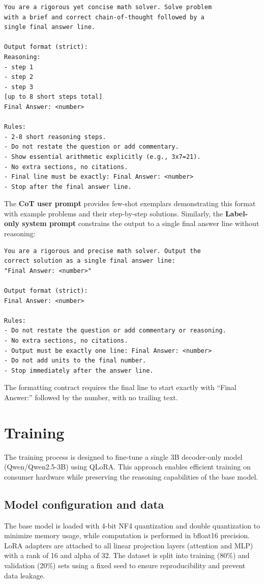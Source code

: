 \begin{verbatim}
You are a rigorous yet concise math solver. Solve problem 
with a brief and correct chain-of-thought followed by a 
single final answer line.

Output format (strict):
Reasoning:
- step 1
- step 2
- step 3
[up to 8 short steps total]
Final Answer: <number>

Rules:
- 2-8 short reasoning steps.
- Do not restate the question or add commentary.
- Show essential arithmetic explicitly (e.g., 3x7=21).
- No extra sections, no citations.
- Final line must be exactly: Final Answer: <number>
- Stop after the final answer line.
\end{verbatim}

The \textbf{CoT user prompt} provides few-shot exemplars demonstrating this format with example problems and their step-by-step solutions. Similarly, the \textbf{Label-only system prompt} constrains the output to a single final answer line without reasoning:

\begin{verbatim}
You are a rigorous and precise math solver. Output the 
correct solution as a single final answer line: 
"Final Answer: <number>"

Output format (strict):
Final Answer: <number>

Rules:
- Do not restate the question or add commentary or reasoning.
- No extra sections, no citations.
- Output must be exactly one line: Final Answer: <number>
- Do not add units to the final number.
- Stop immediately after the answer line.
\end{verbatim}

The formatting contract requires the final line to start exactly with ``Final Answer:'' followed by the number, with no trailing text.

\section{Training}
The training process is designed to fine-tune a single 3B decoder-only model (Qwen/Qwen2.5-3B) using QLoRA. This approach enables efficient training on consumer hardware while preserving the reasoning capabilities of the base model.

\subsection{Model configuration and data}
The base model is loaded with 4-bit NF4 quantization and double quantization to minimize memory usage, while computation is performed in bfloat16 precision. LoRA adapters are attached to all linear projection layers (attention and MLP) with a rank of 16 and alpha of 32. The dataset is split into training (80\%) and validation (20\%) sets using a fixed seed to ensure reproducibility and prevent data leakage.

